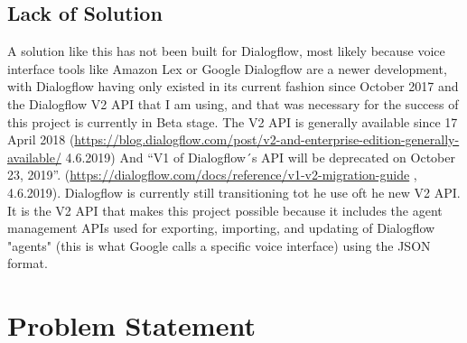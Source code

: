 \section{Lack of Solution}
A solution like this has not been built for Dialogflow, most likely because voice interface tools like Amazon Lex or Google Dialogflow are a newer development, with Dialogflow having only existed in its current fashion since October 2017 \citeNeeded and the Dialogflow V2 API that I am using, and that was necessary for the success of this project is currently in Beta stage. The V2 API is generally available since 17 April 2018
(\url{https://blog.dialogflow.com/post/v2-and-enterprise-edition-generally-available/}  4.6.2019)
And “V1 of Dialogflow´s API will be deprecated on October 23, 2019”. (\url{https://dialogflow.com/docs/reference/v1-v2-migration-guide} , 4.6.2019).
Dialogflow is currently still transitioning tot he use oft he new V2 API.
It is the V2 API that makes this project possible because it includes the agent management APIs used for exporting, importing, and updating of Dialogflow "agents" (this is what Google calls a specific voice interface) using the JSON format.

\chapter{Problem Statement}

